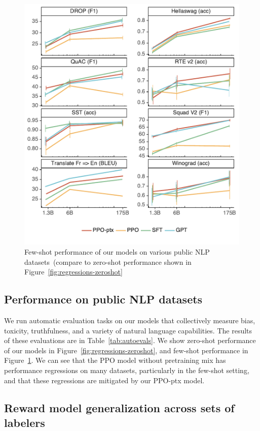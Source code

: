\documentclass{article}
\begin{document}
\begin{figure}[h]
    \centering
    \includegraphics[width=\linewidth]{figs/academic-fewshot.pdf}
    \caption{Few-shot performance of our models on various public NLP datasets~(compare to zero-shot performance shown in Figure~\ref{fig:regressions-zeroshot}}
    \label{fig:regressions-fewshot}
\end{figure}

\subsection{Performance on public NLP datasets}
We run automatic evaluation tasks on our models that collectively measure bias, toxicity, truthfulness, and a variety of natural language capabilities. The results of these evaluations are in Table~\ref{tab:autoevals}.
We show zero-shot performance of our models in Figure~\ref{fig:regressions-zeroshot}, and few-shot performance in Figure~\ref{fig:regressions-fewshot}. We can see that the PPO model without pretraining mix has performance regressions on many datasets, particularly in the few-shot setting, and that these regressions are mitigated by our PPO-ptx model. 


\subsection{Reward model generalization across sets of labelers}
\end{document}
